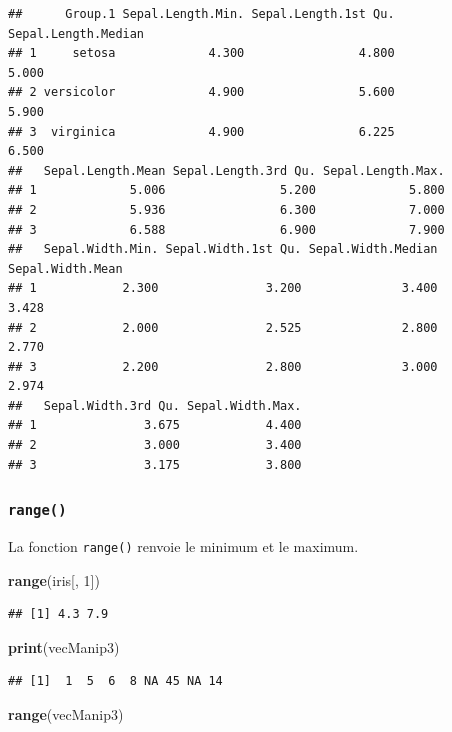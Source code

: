 \documentclass[]{book}
\newenvironment{Shaded}{\begin{snugshade}}{\end{snugshade}}
\newcommand{\DecValTok}[1]{\textcolor[rgb]{0.00,0.00,0.81}{#1}}
\newcommand{\KeywordTok}[1]{\textcolor[rgb]{0.13,0.29,0.53}{\textbf{#1}}}
\newcommand{\NormalTok}[1]{#1}
\begin{document}
\begin{verbatim}
##      Group.1 Sepal.Length.Min. Sepal.Length.1st Qu. Sepal.Length.Median
## 1     setosa             4.300                4.800               5.000
## 2 versicolor             4.900                5.600               5.900
## 3  virginica             4.900                6.225               6.500
##   Sepal.Length.Mean Sepal.Length.3rd Qu. Sepal.Length.Max.
## 1             5.006                5.200             5.800
## 2             5.936                6.300             7.000
## 3             6.588                6.900             7.900
##   Sepal.Width.Min. Sepal.Width.1st Qu. Sepal.Width.Median Sepal.Width.Mean
## 1            2.300               3.200              3.400            3.428
## 2            2.000               2.525              2.800            2.770
## 3            2.200               2.800              3.000            2.974
##   Sepal.Width.3rd Qu. Sepal.Width.Max.
## 1               3.675            4.400
## 2               3.000            3.400
## 3               3.175            3.800
\end{verbatim}

\hypertarget{l015range}{%
\subsubsection{\texorpdfstring{\texttt{range()}}{range()}}\label{l015range}}

La fonction \texttt{range()} renvoie le minimum et le maximum.

\begin{Shaded}
\begin{Highlighting}[]
\KeywordTok{range}\NormalTok{(iris[, }\DecValTok{1}\NormalTok{])}
\end{Highlighting}
\end{Shaded}

\begin{verbatim}
## [1] 4.3 7.9
\end{verbatim}

\begin{Shaded}
\begin{Highlighting}[]
\KeywordTok{print}\NormalTok{(vecManip3)}
\end{Highlighting}
\end{Shaded}

\begin{verbatim}
## [1]  1  5  6  8 NA 45 NA 14
\end{verbatim}

\begin{Shaded}
\begin{Highlighting}[]
\KeywordTok{range}\NormalTok{(vecManip3)}
\end{Highlighting}
\end{Shaded}
\end{document}
